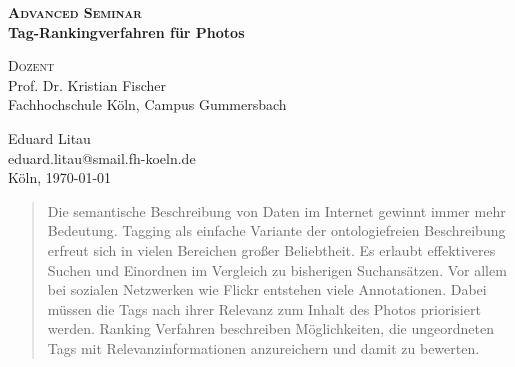 %
%
%
%

\begin{titlepage}
\center
\vspace*{3em}
\large \textbf{\textsc{Advanced Seminar}}\\ 
\vspace{1em}
\huge\textbf{{\sffamily Tag-Rankingverfahren für Photos}}
\vspace{3em}

\large
\textsc{Dozent}\\
 Prof. Dr. Kristian Fischer \\
\vspace{1em}
 Fachhochschule Köln, Campus Gummersbach\\
\vspace{9em}

\large Eduard Litau\\
\large eduard.litau@smail.fh-koeln.de\\
\vspace{14em}
Köln, \today
\end{titlepage}

\begin{abstract}
Die semantische Beschreibung von Daten im Internet gewinnt immer mehr Bedeutung. Tagging als einfache Variante der ontologiefreien Beschreibung erfreut sich in vielen Bereichen großer Beliebtheit. Es erlaubt effektiveres Suchen und Einordnen im Vergleich zu bisherigen Suchansätzen. Vor allem bei sozialen Netzwerken wie Flickr entstehen viele Annotationen. Dabei müssen die Tags nach ihrer Relevanz zum Inhalt des Photos priorisiert werden. Ranking Verfahren beschreiben Möglichkeiten, die ungeordneten Tags mit Relevanzinformationen anzureichern und damit zu bewerten. 
\end{abstract}